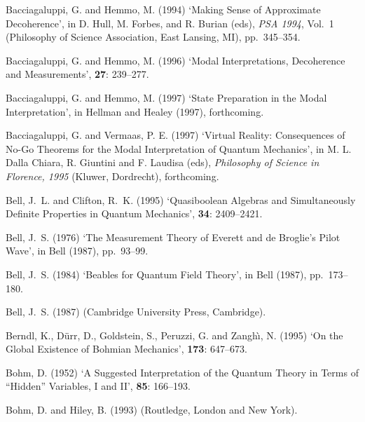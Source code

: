 \documentclass[12pt]{article}
\begin{document}
\begin{thebibliography}{10}
Bacciagaluppi, G. and Hemmo, M. (1994)
\newblock `Making Sense of Approximate Decoherence',
\newblock in D. Hull, M. Forbes, and R. Burian (eds), {\em PSA 1994},
Vol.~1 (Philosophy of Science Association, East Lansing, MI),
\mbox{pp. 345--354}.

Bacciagaluppi, G. and Hemmo, M. (1996)
\newblock `Modal Interpretations, Decoherence and Measurements',
 {\bf 27}: 239--277.

Bacciagaluppi, G. and Hemmo, M. (1997)
\newblock `State Preparation in the Modal Interpretation',
\newblock in Hellman and Healey (1997), forthcoming.

Bacciagaluppi, G. and Vermaas, P. E. (1997)
\newblock `Virtual Reality: Consequences of No-Go Theorems for the Modal
Interpretation of Quantum Mechanics',
\newblock in M. L. Dalla Chiara, R. Giuntini and F. Laudisa (eds),
{\em Philosophy of Science in Florence, 1995}
(Kluwer, Dordrecht), forthcoming.

  Bell, J.~L. and Clifton, R.~K. (1995)
\newblock `Quasiboolean Algebras and Simultaneously Definite Properties
in Quantum Mechanics',
{\bf 34}: 2409--2421.

Bell, J.~S. (1976)
\newblock `The Measurement Theory of Everett and de
Broglie's Pilot Wave',
\newblock in Bell (1987), \mbox{pp. 93--99}.

Bell, J.~S. (1984)
\newblock `Beables for Quantum Field Theory',
\newblock in Bell (1987), \mbox{pp. 173--180}.

Bell, J.~S. (1987)
(Cambridge University Press, Cambridge).

Berndl, K., D\"{u}rr, D., Goldstein, S., Peruzzi, G. and
Zangh\`{\i}, N. (1995)
\newblock `On the Global Existence of Bohmian Mechanics',
{\bf 173}: 647--673.

Bohm, D. (1952)
\newblock `A Suggested Interpretation of the Quantum Theory in Terms of
``Hidden'' Variables, I and II',
 {\bf 85}: 166--193.

Bohm, D. and Hiley, B. (1993)
 (Routledge, London and New York).


\end{thebibliography}
\end{document}
